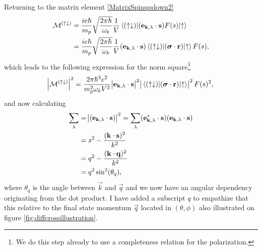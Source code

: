 Returning to the matrix element \eqref{MatrixSpinupdown2}
\begin{align}
    \mathcal{M^{(\uparrow\downarrow)}} &= \frac{ie\hbar}{m_p}\sqrt{\frac{2\pi \hbar}{\omega_k}}\frac{1}{V}\mel*{(\uparrow\downarrow)}{(\bm{\mathrm{e}}_{\bm{\mathrm{k}},\lambda}\cdot\bm{\mathrm{s}})F(s)}{\uparrow} \\
    &=\frac{ie\hbar}{m_p}\sqrt{\frac{2\pi \hbar}{\omega_k}}\frac{1}{V} (\bm{\mathrm{e}}_{\bm{\mathrm{k}},\lambda}\cdot\bm{\mathrm{s}})\mel*{(\uparrow\downarrow)}{(\bm{\mathrm{\sigma}}\cdot \bm{\mathrm{r}})}{\uparrow}F(s),
\end{align}
which leads to the following expression for the norm square\footnote{We do this step already to use a completeness relation for the polarization.}
\begin{equation} \label{matrixspinupdownabs}
    \abs{\mathcal{M}^{(\uparrow\downarrow)}}^2 = \frac{2\pi\hbar^3e^2}{m_p^2\omega_k V^2} \abs{\bm{\mathrm{e}}_{\bm{\mathrm{k}},\lambda}\cdot \bm{\mathrm{s}}}^2 \abs{\mel*{(\uparrow\downarrow)}{(\bm{\mathrm{\sigma}}\cdot \bm{\mathrm{r}})}{\uparrow}}^2 F(s)^2,
\end{equation}
and now calculating
\begin{align} \label{sumoverpol}
    \sum_\lambda &= \abs{(\bm{\mathrm{e}}_{\bm{\mathrm{k}},\lambda} \cdot \bm{\mathrm{s}})}^2 = \sum_\lambda (\bm{\mathrm{e}}_{\bm{\mathrm{k}},\lambda}^*\cdot \bm{\mathrm{s}})(\bm{\mathrm{e}}_{\bm{\mathrm{k}},\lambda}\cdot\bm{\mathrm{s}}) \\
    &= s^2 -\frac{(\bm{\mathrm{k}}\cdot \bm{\mathrm{s}})^2}{k^2} \\
    &= q^2 -\frac{(\bm{\mathrm{k}}\cdot \bm{\mathrm{q}})^2}{k^2} \\
    &= q^2 \sin^2(\theta_q),
\end{align}
where $\theta_q$ is the angle between $\vec{k}$ and $\vec{q}$ and we now have an angular dependency originating from the dot product. I have added a subscript $q$ to empathize that this relative to the final state momentum $\vec{q}$ located in $(\theta, \phi)$ also illustrated on figure \ref{fig:diffcrossillustration}.

